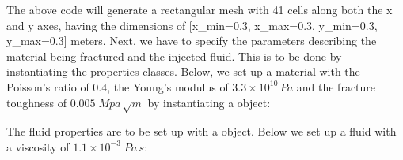 \documentclass[letterpaper,10pt,english]{sphinxmanual}
\begin{document}
\begin{sphinxVerbatim}[commandchars=\\\{\}]
   

     
\end{sphinxVerbatim}

\sphinxAtStartPar
The above code will generate a rectangular mesh with 41 cells along both the x and y axes, having the dimensions of {[}x\_min=\sphinxhyphen{}0.3, x\_max=0.3, y\_min=\sphinxhyphen{}0.3, y\_max=0.3{]} meters. Next, we have to specify the parameters describing the material being fractured and the injected fluid. This is to be done by instantiating the properties classes. Below, we set up a material with the Poisson’s ratio of \(0.4\), the Young’s modulus of \(3.3\times10^{10}\,Pa\)  and the fracture toughness of \(0.005\;Mpa\,\sqrt{m}\) by instantiating a  object:

\begin{sphinxVerbatim}[commandchars=\\\{\}]
   

                              
                   
         
                            

    
\end{sphinxVerbatim}

\sphinxAtStartPar
The fluid properties are to be set up with a  object. Below we set up a fluid with a viscosity of \(1.1\times 10^{-3}\;Pa\,s\):

\begin{sphinxVerbatim}[commandchars=\\\{\}]
   

  
\end{sphinxVerbatim}
\end{document}
